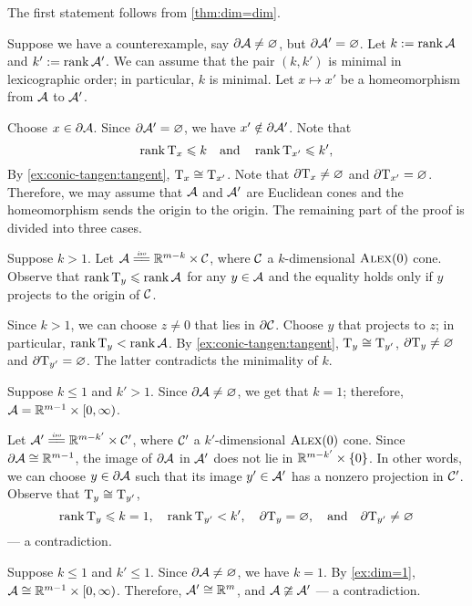 The first statement follows from \ref{thm:dim=dim}.

Suppose we have a counterexample, say $\partial \mathcal{A}\ne \varnothing$, but $\partial \mathcal{A}'=\varnothing$.
Let $k\mathrel{:=}\operatorname{\rm rank}\nolimits \mathcal{A}$ and $k'\mathrel{:=}\operatorname{\rm rank}\nolimits \mathcal{A}'$.
We can assume that the pair $(k,k')$ is minimal in lexicographic order;
in particular, $k$ is minimal.
Let $x\mapsto x'$ be a homeomorphism from $\mathcal{A}$ to $\mathcal{A}'$.

Choose $x\in \partial \mathcal{A}$.
Since $\partial \mathcal{A}'=\varnothing$, we have $x'\notin \partial \mathcal{A}'$.
Note that 
\[\operatorname{\rm rank}\nolimits \mathrm{T}_x\leqslant k
\quad\text{and}\quad
\operatorname{\rm rank}\nolimits \mathrm{T}_{x'}\leqslant k',
\]
By \ref{ex:conic-tangen:tangent}, $\mathrm{T}_x\cong\mathrm{T}_{x'}$.
Note that $\partial \mathrm{T}_x\ne\varnothing$ and $\partial \mathrm{T}_{x'}=\varnothing$.
Therefore, we may assume that $\mathcal{A}$ and $\mathcal{A}'$ are Euclidean cones
and the homeomorphism sends the origin to the origin.
The remaining part of the proof is divided into three cases.

Suppose $k>1$.
Let $\spc{A}\iso \RR^{m-k}\times \spc{C}$, where $\mathcal{C}$ a $k$-dimensional $\textsc{Alex}(0)$ cone.
Observe that $\operatorname{\rm rank}\nolimits\mathrm{T}_y\leqslant\operatorname{\rm rank}\nolimits\mathcal{A}$ for any $y\in\mathcal{A}$ and the equality holds only if $y$ projects to the origin of $\mathcal{C}$.

Since $k>1$, we can choose $z\ne 0$ that lies in $\partial\mathcal{C}$.
Choose $y$ that projects to $z$;
in particular, $\operatorname{\rm rank}\nolimits\mathrm{T}_y<\operatorname{\rm rank}\nolimits\mathcal{A}$.
By \ref{ex:conic-tangen:tangent}, $\mathrm{T}_y\cong\mathrm{T}_{y'}$,
$\partial  \mathrm{T}_y\ne\varnothing$ and $\partial \mathrm{T}_{y'}=\varnothing$.
The latter contradicts the minimality of $k$.

 Suppose $k\le1$ and $k'>1$.
Since $\partial \mathcal{A}\ne \varnothing$, we get that $k=1$;
therefore, $\mathcal{A}=\mathbb{R}^{m-1}\times[0,\infty)$.

Let $\spc{A}'\iso \RR^{m-k'}\times \spc{C}'$, where $\mathcal{C}'$ a $k'$-dimensional $\textsc{Alex}(0)$ cone.
Since $\partial\mathcal{A}\cong\mathbb{R}^{m-1}$,
the image of $\partial\mathcal{A}$ in $\mathcal{A}'$ does not lie in $\mathbb{R}^{m-k'}\times\{0\}$.
In other words, we can choose $y\in \partial \mathcal{A}$ such that its image $y'\in \mathcal{A}'$ has a nonzero projection in $\mathcal{C}'$.
Observe that $\mathrm{T}_y\cong\mathrm{T}_{y'}$,
\[
\operatorname{\rm rank}\nolimits\mathrm{T}_y\leqslant k=1,
\quad
\operatorname{\rm rank}\nolimits\mathrm{T}_{y'}< k',
\quad
\partial \mathrm{T}_y=\varnothing,
\quad\text{and}\quad
\partial \mathrm{T}_{y'}\ne \varnothing\]
--- a contradiction.

Suppose $k\le 1$ and $k'\le 1$.
Since $\partial \mathcal{A}\ne \varnothing$, we have $k=1$.
By \ref{ex:dim=1}, $\mathcal{A}\cong \mathbb{R}^{m-1}\times[0,\infty)$.
Therefore, $\mathcal{A}'\cong\mathbb{R}^m$, and $\mathcal{A}\ncong\mathcal{A}'$ --- a contradiction.
\qeds

